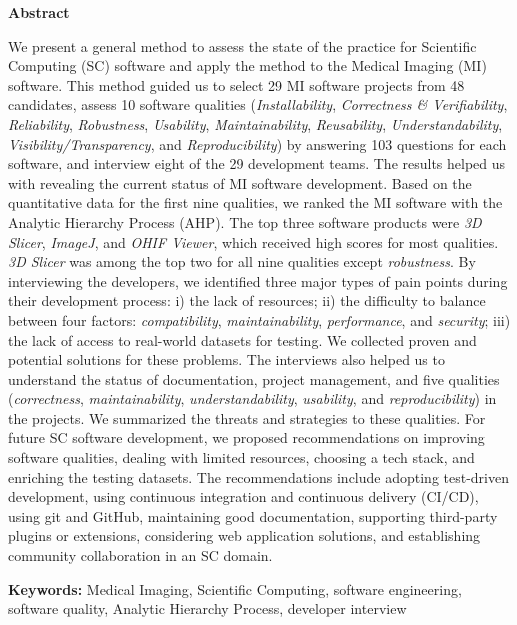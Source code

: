 \begin{center}
\textbf{\large Abstract}
\end{center}

\begingroup
{}
We present a general method to assess the state of the practice for Scientific Computing (SC) software and apply the method to the Medical Imaging (MI) software. This method guided us to select 29 MI software projects from 48 candidates, assess 10 software qualities (\textit{Installability}, \textit{Correctness \& Verifiability}, \textit{Reliability}, \textit{Robustness}, \textit{Usability}, \textit{Maintainability}, \textit{Reusability}, \textit{Understandability}, \textit{Visibility/Transparency}, and \textit{Reproducibility}) by answering 103 questions for each software, and interview eight of the 29 development teams. The results helped us with revealing the current status of MI software development. Based on the quantitative data for the first nine qualities, we ranked the MI software with the Analytic Hierarchy Process (AHP). The top three software products were \textit{3D Slicer}, \textit{ImageJ}, and \textit{OHIF Viewer}, which received high scores for most qualities. \textit{3D Slicer} was among the top two for all nine qualities except \textit{robustness}. By interviewing the developers, we identified three major types of pain points during their development process: i) the lack of resources; ii) the difficulty to balance between four factors: \textit{compatibility}, \textit{maintainability}, \textit{performance}, and \textit{security};
iii) the lack of access to real-world datasets for testing. We collected proven and potential solutions for these problems. The interviews also helped us to understand the status of documentation, project management, and five qualities (\textit{correctness}, \textit{maintainability}, \textit{understandability}, \textit{usability}, and \textit{reproducibility}) in the projects. We summarized the threats and strategies to these qualities. For future SC software development, we proposed recommendations on improving software qualities, dealing with limited resources, choosing a tech stack, and enriching the testing datasets. The recommendations include adopting test-driven development, using continuous integration and continuous delivery (CI/CD), using git and GitHub, maintaining good documentation, supporting third-party plugins or extensions, considering web application solutions, and establishing community collaboration in an SC domain.  \newline

\noindent\textbf{Keywords:} Medical Imaging, Scientific Computing, software engineering, software quality, Analytic Hierarchy Process, developer interview
\endgroup

